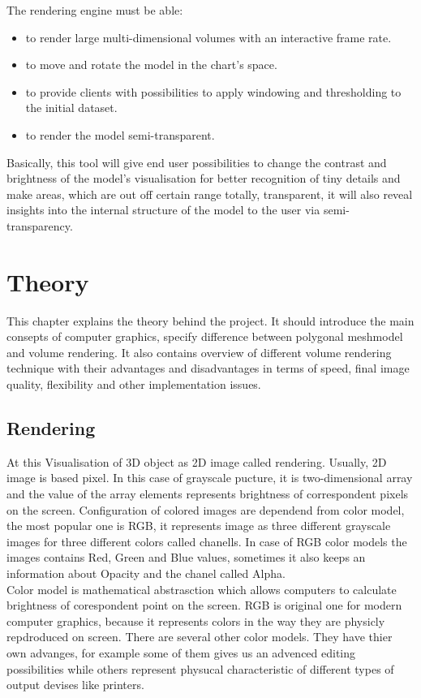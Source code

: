 \documentclass[english, 11pt]{report}
\begin{document}
The rendering engine must be able:
\begin{itemize} 
\item to render large multi-dimensional volumes with an interactive frame rate.
\item to move and rotate the model in the chart's space.
\item to provide clients with possibilities to apply windowing and thresholding to the initial dataset.
\item to render the model semi-transparent.
\end{itemize}

Basically, this tool will give end user possibilities to change the contrast and brightness of the model's visualisation for better recognition of tiny details and make areas, which are out off certain range totally, transparent, it will also reveal insights into the internal structure of the model to the user via semi-transparency.

\chapter{Theory}

This chapter explains the theory behind the project. It should introduce the main consepts of computer graphics, specify difference between polygonal meshmodel and volume rendering. It also contains overview of different volume rendering technique with their advantages and disadvantages in terms of speed, final image quality, flexibility and other implementation issues.

\section{Rendering}

At this Visualisation of 3D object as 2D image called rendering. Usually, 2D image is based pixel. In this case of grayscale pucture, it is two-dimensional array and the value of the array elements represents brightness of correspondent pixels on the screen. Configuration of colored images are dependend from color model, the most popular one is RGB, it represents image as three different grayscale images for three different colors called chanells. In case of RGB color models the images contains Red, Green and Blue values, sometimes it also keeps  an information about Opacity and the chanel called Alpha.\\

Color model is mathematical abstrasction which allows computers to calculate brightness of corespondent point on the screen. RGB is original one for modern computer graphics, because it represents colors in the way they are physicly repdroduced on screen. There are several other color models. They have thier own advanges, for example some of them gives us an advenced editing possibilities while others represent physucal characteristic of different types of output devises like printers.\\
\end{document}
